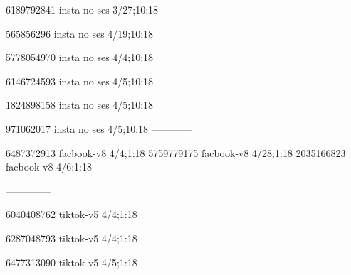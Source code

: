 6189792841 insta no ses
3/27;10:18

565856296 insta no ses
4/19;10:18

5778054970 insta no ses
4/4;10:18

6146724593 insta no ses
4/5;10:18

1824898158 insta no ses
4/5;10:18

971062017 insta no ses
4/5;10:18
------------

6487372913 facbook-v8
4/4;1:18
5759779175 facbook-v8
4/28;1:18
2035166823 facbook-v8
4/6;1:18

--------------

6040408762 tiktok-v5
4/4;1:18

6287048793 tiktok-v5
4/4;1:18

6477313090 tiktok-v5
4/5;1:18
